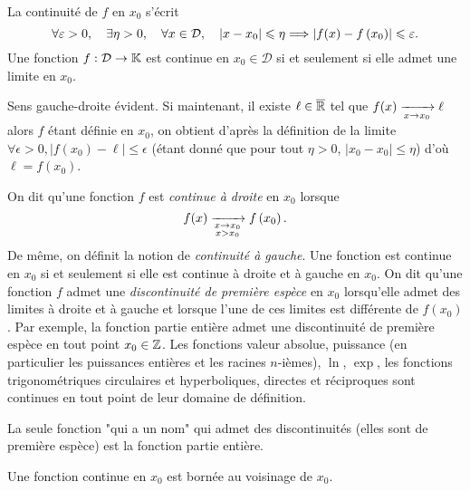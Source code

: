 \documentclass{magnolia}
\begin{document}
\begin{remarques}
\remarque La continuité de $f$ en $x_0$ s'écrit 
  \[\forall \varepsilon>0 ,\quad \exists \eta>0 ,\quad \forall x\in\mathcal{D}
    ,\quad \left|x-x_0\right|\leqslant\eta \Longrightarrow \left|f(x)-f\left(x_0\right)\right|\leqslant\varepsilon.\]
\remarque Une fonction $f:\mathcal{D}\to\mathbb{K}$ est continue en $x_0\in\mathcal{D}$ si et seulement si
  elle admet une limite en $x_0$.
\begin{sol}
Sens gauche-droite évident. Si maintenant, il existe $\ell \in \overline{\mathbb{R}}$ tel que $f(x)\xrightarrow[x\rightarrow x_0]{} \ell$ alors $f$ étant définie en $x_0$, on obtient d'après la définition de la limite $\forall \epsilon>0, |f(x_0)-\ell|\leq \epsilon$ (étant donné que pour tout $\eta>0$, $|x_0-x_0|\leq \eta$) d'où $\ell=f(x_0)$.
\end{sol}
\remarque On dit qu'une fonction $f$ est \emph{continue à droite} en $x_0$ lorsque
  \[f(x)\xrightarrow[ \substack{x\rightarrow x_0 \\ x>x_0}]{} f\left(x_0\right).\]
  De même, on définit la notion de \emph{continuité à gauche}. Une fonction est
  continue en $x_0$ si et seulement si elle est continue à droite et à gauche
  en $x_0$.
\remarque On dit qu'une fonction $f$ admet une \emph{discontinuité de première
  espèce} en $x_0$ lorsqu'elle admet des limites à droite et à gauche
  et lorsque l'une de ces limites est différente de $f(x_0)$.
  Par exemple, la fonction partie entière admet une discontinuité de première
  espèce en tout point $x_0\in\mathbb{Z}$.
\remarque Les fonctions valeur absolue, puissance (en particulier les puissances
  entières et les racines $n$-ièmes), $\ln$, $\exp$, les fonctions
  trigonométriques circulaires et hyperboliques, directes et réciproques sont
  continues en tout point de leur domaine de définition.
  \begin{sol}
La seule fonction "qui a un nom" qui admet des discontinuités (elles sont de première espèce) est la fonction partie entière.
\end{sol} 
\remarque Une fonction continue en $x_0$ est bornée au voisinage de $x_0$.
\end{remarques}
\end{document}
